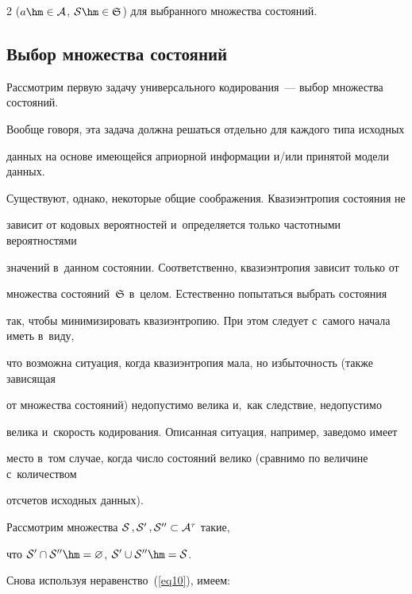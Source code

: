 \begin{multicols}{2}
($a\hm\in{\cal A}$, ${\cal S}\hm\in{\frak S}$) для выбранного множества со\-сто\-яний.



\vspace*{-9pt}



\subsection{Выбор множества состояний}



Рассмотрим первую задачу универсального кодирования~--- выбор множества состояний. 

Вообще говоря, эта задача должна решаться отдельно для каж\-до\-го типа исходных 

данных на основе имеющейся априорной информации и/или принятой модели данных. 

Существуют, однако, некоторые общие соображения. Квазиэнтропия состояния не 

зависит от кодовых вероятностей и~определяется только частотными вероятностями 

значений в~данном состоянии. Соответственно, квазиэнтропия зависит только от 

множества состояний~${\frak S}$ в~целом. Естественно попытаться выбрать состояния 

так, чтобы минимизировать квазиэнтропию. При этом следует с~самого начала иметь в~виду, 

что возможна ситуация, когда квазиэнтропия мала, но избыточность (также зависящая 

от множества состояний) не\-до\-пус\-ти\-мо велика и,~как следствие, недопустимо 

велика и~скорость кодирования. Описанная ситуация, например, заведомо имеет 

место в~том случае, когда число состояний велико (сравнимо по величине с~количеством 

отсчетов исходных данных).



Рассмотрим множества ${\cal S}\,,{\cal S}'\,,{\cal S}''\subset{\cal A}^\tau$ такие, 

что ${\cal S}'\cap{\cal S}''\hm =\varnothing$, ${\cal S}'\cup{\cal S}'' \hm={\cal S}$. 

Снова используя неравенство~(\ref{eq10}), имеем:

\begin{multline*}


\end{multline*}
\end{multicols}
